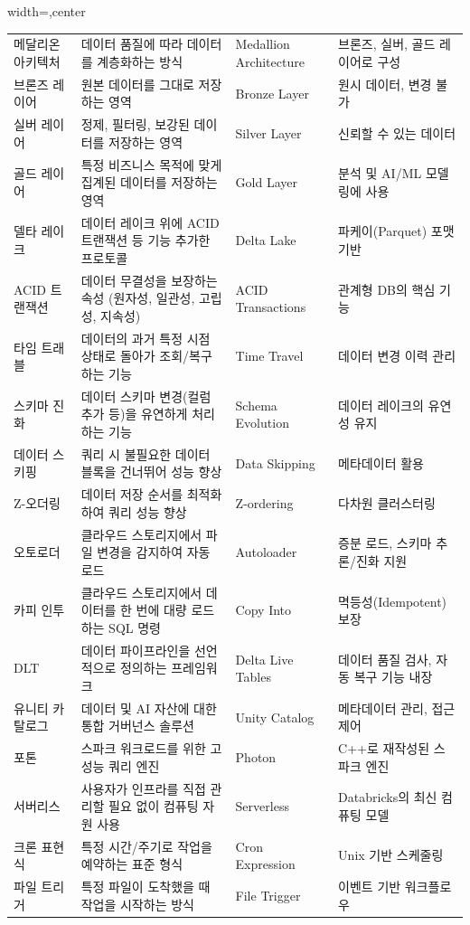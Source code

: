 \documentclass[11pt,a4paper]{article}
\theoremstyle{definition}
\begin{document}
\begin{tcolorbox}[title=\textbf{핵심 용어집}, colback=blue!5!white, colframe=blue!75!black, sharp corners, boxrule=0.8pt]
\begin{adjustbox}{width=\textwidth,center}
\begin{tabular}{llll}
\midrule
메달리온 아키텍처 & 데이터 품질에 따라 데이터를 계층화하는 방식 & Medallion Architecture & 브론즈, 실버, 골드 레이어로 구성 \\
브론즈 레이어 & 원본 데이터를 그대로 저장하는 영역 & Bronze Layer & 원시 데이터, 변경 불가 \\
실버 레이어 & 정제, 필터링, 보강된 데이터를 저장하는 영역 & Silver Layer & 신뢰할 수 있는 데이터 \\
골드 레이어 & 특정 비즈니스 목적에 맞게 집계된 데이터를 저장하는 영역 & Gold Layer & 분석 및 AI/ML 모델링에 사용 \\
\midrule
델타 레이크 & 데이터 레이크 위에 ACID 트랜잭션 등 기능 추가한 프로토콜 & Delta Lake & 파케이(Parquet) 포맷 기반 \\
ACID 트랜잭션 & 데이터 무결성을 보장하는 속성 (원자성, 일관성, 고립성, 지속성) & ACID Transactions & 관계형 DB의 핵심 기능 \\
타임 트래블 & 데이터의 과거 특정 시점 상태로 돌아가 조회/복구하는 기능 & Time Travel & 데이터 변경 이력 관리 \\
스키마 진화 & 데이터 스키마 변경(컬럼 추가 등)을 유연하게 처리하는 기능 & Schema Evolution & 데이터 레이크의 유연성 유지 \\
데이터 스키핑 & 쿼리 시 불필요한 데이터 블록을 건너뛰어 성능 향상 & Data Skipping & 메타데이터 활용 \\
Z-오더링 & 데이터 저장 순서를 최적화하여 쿼리 성능 향상 & Z-ordering & 다차원 클러스터링 \\
\midrule
오토로더 & 클라우드 스토리지에서 파일 변경을 감지하여 자동 로드 & Autoloader & 증분 로드, 스키마 추론/진화 지원 \\
카피 인투 & 클라우드 스토리지에서 데이터를 한 번에 대량 로드하는 SQL 명령 & Copy Into & 멱등성(Idempotent) 보장 \\
DLT & 데이터 파이프라인을 선언적으로 정의하는 프레임워크 & Delta Live Tables & 데이터 품질 검사, 자동 복구 기능 내장 \\
유니티 카탈로그 & 데이터 및 AI 자산에 대한 통합 거버넌스 솔루션 & Unity Catalog & 메타데이터 관리, 접근 제어 \\
포톤 & 스파크 워크로드를 위한 고성능 쿼리 엔진 & Photon & C++로 재작성된 스파크 엔진 \\
서버리스 & 사용자가 인프라를 직접 관리할 필요 없이 컴퓨팅 자원 사용 & Serverless & Databricks의 최신 컴퓨팅 모델 \\
\midrule
크론 표현식 & 특정 시간/주기로 작업을 예약하는 표준 형식 & Cron Expression & Unix 기반 스케줄링 \\
파일 트리거 & 특정 파일이 도착했을 때 작업을 시작하는 방식 & File Trigger & 이벤트 기반 워크플로우 \\

\end{tabular}
\end{adjustbox}
\end{tcolorbox}
\end{document}

